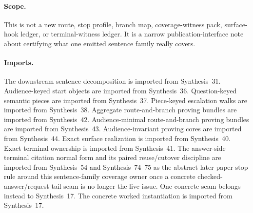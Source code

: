 \documentclass[11pt]{article}
\begin{document}
\paragraph{Scope.}
This is not a new route, stop profile, branch map, coverage-witness pack, surface-hook ledger, or terminal-witness ledger.
It is a narrow publication-interface note about certifying what one emitted sentence family really covers.

\paragraph{Imports.}
The downstream sentence decomposition is imported from Synthesis~31.\cite{series:downstreamnormalforms}
Audience-keyed start objects are imported from Synthesis~36.\cite{series:challengeroutes}
Question-keyed semantic pieces are imported from Synthesis~37.\cite{series:challengestops}
Piece-keyed escalation walks are imported from Synthesis~38.\cite{series:challengebranches}
Aggregate route-and-branch proving bundles are imported from Synthesis~42.\cite{series:challengecoveragewitnesspacks}
Audience-minimal route-and-branch proving bundles are imported from Synthesis~43.\cite{series:challengecoveragewitnessslices}
Audience-invariant proving cores are imported from Synthesis~44.\cite{series:challengecoveragewitnesscores}
Exact surface realization is imported from Synthesis~40.\cite{series:challengesurfacehooks}
Exact terminal ownership is imported from Synthesis~41.\cite{series:challengeterminalwitnesses}
The answer-side terminal citation normal form and its paired reuse/cutover discipline are imported from Synthesis~54 and Synthesis~74--75 as the abstract later-paper stop rule around this sentence-family coverage owner once a concrete checked-answer/request-tail seam is no longer the live issue. One concrete seam belongs instead to Synthesis~17.\cite{series:challengeanswerreviewmenus,series:publicrequestresponsepacketrefreshresponsepacketclosureverdicts,series:pairedterminalcitationdiscipline,series:pairedterminalcutoverrules,series:workedexample}
The concrete worked instantiation is imported from Synthesis~17.\cite{series:workedexample}
\end{document}
